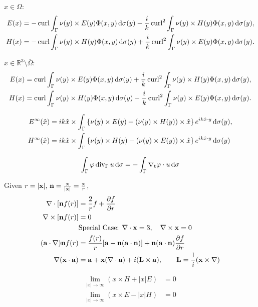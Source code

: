 $x\in\Omega$:  
\begin{align*}
  E(x) &= -\operatorname{curl}\int_{\Gamma}\nu(y)\times E(y)\Phi(x,y)\,\text{d}\sigma(y)-\frac{i}{k}\operatorname{curl}^2\int_{\Gamma}\nu(y)\times H(y)\Phi(x,y)\,\text{d}\sigma(y), \\
  H(x) &= -\operatorname{curl}\int_{\Gamma}\nu(y)\times H(y)\Phi(x,y)\,\text{d}\sigma(y)+\frac{i}{k}\operatorname{curl}^2\int_{\Gamma}\nu(y)\times E(y)\Phi(x,y)\,\text{d}\sigma(y).
\end{align*}

$x\in\mathbb{R}^3\setminus\overline{\Omega}$: 
\begin{align*}
  E(x) &= \operatorname{curl}\int_{\Gamma}\nu(y)\times E(y)\Phi(x,y)\,\text{d}\sigma(y)+\frac{i}{k}\operatorname{curl}^2\int_{\Gamma}\nu(y)\times H(y)\Phi(x,y)\,\text{d}\sigma(y), \\
  H(x) &= \operatorname{curl}\int_{\Gamma}\nu(y)\times H(y)\Phi(x,y)\,\text{d}\sigma(y)-\frac{i}{k}\operatorname{curl}^2\int_{\Gamma}\nu(y)\times E(y)\Phi(x,y)\,\text{d}\sigma(y).
\end{align*}

\begin{align*}
  E^\infty(\hat{x}) &= ik\hat{x}\times\int_{\Gamma}\left\{\nu(y)\times E(y) + \left(\nu(y)\times H(y)\right)\times\hat{x}\right\}e^{ik\hat{x}\cdot y}\,\text{d}\sigma(y), \\
  H^\infty(\hat{x}) &= ik\hat{x}\times\int_{\Gamma}\left\{\nu(y)\times H(y) - \left(\nu(y)\times E(y)\right)\times\hat{x}\right\}e^{ik\hat{x}\cdot y}\,\text{d}\sigma(y)
\end{align*}

\begin{align*}
  \int_{\Gamma}\varphi\operatorname{div}_\Gamma u\,\text{d}\sigma=-\int_{\Gamma}\nabla_{\text{t}}\varphi\cdot u\,\text{d}\sigma
\end{align*} 



Given $r = |{\bf x}|,\,{\bf n} = \frac{{\bf x}}{|{\bf x}|} = \frac{{\bf x}}{r}$,
\begin{align*}
  \nabla\cdot[{\bf n}f(r)] &= \frac{2}{r} f + \frac{\partial f}{\partial r} \\
  \nabla\times[{\bf n}f(r)] &=0 \\
  &\text{Special Case: }\nabla\cdot{\bf x} = 3,\quad\nabla\times{\bf x} = 0 \\
  ({\bf a}\cdot\nabla){\bf n}f(r) &= \frac{f(r)}{r}[{\bf a}-{\bf n}({\bf a}\cdot{\bf n})] + {\bf n}({\bf a}\cdot{\bf n})\frac{\partial f}{\partial r} \\
  \nabla({\bf x}\cdot{\bf a}) &= {\bf a} + {\bf x}(\nabla\cdot{\bf a}) + i({\bf L}\times{\bf a}),\qquad{\bf L}=\frac{1}{i}({\bf x}\times\nabla) 
\end{align*}


\begin{dfn}
  \begin{align*}
    \lim_{|x|\to\infty}(x\times H+|x|E)&=0\\
    \lim_{|x|\to\infty}(x\times E-|x|H)&=0
  \end{align*}
\end{dfn}
 
